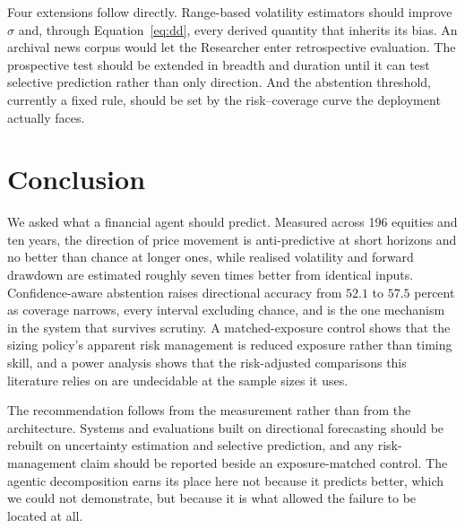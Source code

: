 \documentclass[pdflatex,sn-apa]{sn-jnl}%
\theoremstyle{thmstyleone}%
\theoremstyle{thmstyletwo}%
\theoremstyle{thmstylethree}%
\begin{document}
Four extensions follow directly. Range-based volatility estimators should
improve $\hat{\sigma}$ and, through Equation~\eqref{eq:dd}, every derived
quantity that inherits its bias. An archival news corpus would let the
Researcher enter retrospective evaluation. The prospective test should be
extended in breadth and duration until it can test selective prediction rather
than only direction. And the abstention threshold, currently a fixed rule,
should be set by the risk--coverage curve the deployment actually faces.

\section{Conclusion}\label{sec:conclusion}

We asked what a financial agent should predict. Measured across 196 equities
and ten years, the direction of price movement is anti-predictive at short
horizons and no better than chance at longer ones, while realised volatility
and forward drawdown are estimated roughly seven times better from identical
inputs. Confidence-aware abstention raises directional accuracy from $52.1$ to
$57.5$ percent as coverage narrows, every interval excluding chance, and is the
one mechanism in the system that survives scrutiny. A matched-exposure control
shows that the sizing policy's apparent risk management is reduced exposure
rather than timing skill, and a power analysis shows that the risk-adjusted
comparisons this literature relies on are undecidable at the sample sizes it
uses.

The recommendation follows from the measurement rather than from the
architecture. Systems and evaluations built on directional forecasting should
be rebuilt on uncertainty estimation and selective prediction, and any
risk-management claim should be reported beside an exposure-matched control.
The agentic decomposition earns its place here not because it predicts better,
which we could not demonstrate, but because it is what allowed the failure to
be located at all.

\backmatter

\end{document}
